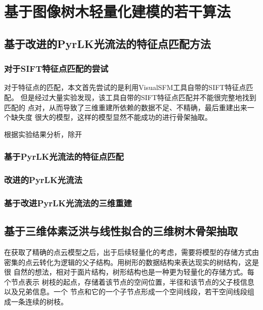
\chapter{基于图像树木轻量化建模的若干算法}
\label{cha:algorithm}
\section{基于改进的PyrLK光流法的特征点匹配方法}
\label{sec:pyrlk}

\subsection{对于SIFT特征点匹配的尝试}
对于特征点的匹配，本文首先尝试的是利用VisualSFM工具自带的SIFT特征点匹配。
但是经过大量实验发现，该工具自带的SIFT特征点匹配并不能很完整地找到匹配的
点对，从而导致了三维重建所依赖的数据不足、不精确，最后重建出来一个缺失度
很大的模型，这样的模型显然不能成功的进行骨架抽取。

根据实验结果分析，除开

\subsection{基于PyrLK光流法的特征点匹配}
\label{subsec:pyrlk}

\subsection{改进的PyrLK光流法}
\label{subsec:revisedpyrlk}

\subsection{基于改进PyrLK光流法的三维重建}


\section{基于三维体素泛洪与线性拟合的三维树木骨架抽取}
\label{sec:sklextract}
在获取了精确的点云模型之后，出于后续轻量化的考虑，需要将模型的存储方式由
密集的点云转化为逻辑的父子结构。用树形的数据结构来表达现实的树结构，这是很
自然的想法，相对于面片结构，树形结构也是一种更为轻量化的存储方式。每个节点表示
树枝的起点，存储着该节点的空间位置，半径和该节点的父子枝信息以及兄弟信息。一个
节点和它的一个子节点形成一个空间线段，若干空间线段组成一条连续的树枝。

